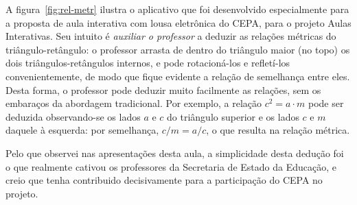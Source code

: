 	A figura~\ref{fig:rel-metr} ilustra o aplicativo que foi desenvolvido especialmente para a proposta de aula interativa com lousa eletrônica do CEPA, para o projeto Aulas Interativas. Seu intuito é \emph{auxiliar o professor} a deduzir as relações métricas do triângulo-retângulo: o professor arrasta de dentro do triângulo maior (no topo) os dois triângulos-retângulos internos, e pode rotacioná-los e refletí-los convenientemente, de modo que fique evidente a relação de semelhança entre eles. Desta forma, o professor pode deduzir muito facilmente as relações, sem os embaraços da abordagem tradicional. Por exemplo, a relação $c^2 = a \cdot m$ pode ser deduzida observando-se os lados $a$ e $c$ do triângulo superior e os lados $c$ e $m$ daquele à esquerda: por semelhança, $c/m = a/c$, o que resulta na relação métrica.
	
	Pelo que observei nas apresentações desta aula, a simplicidade desta dedução foi o que realmente cativou os professores da Secretaria de Estado da Educação, e creio que tenha contribuido decisivamente para a participação do CEPA no projeto.
	
